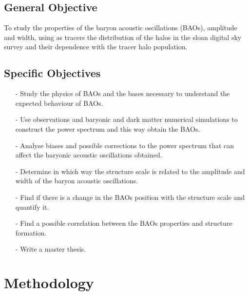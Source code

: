 \documentclass[a4,useAMS,usenatbib,usegraphicx,12pt]{article}
\begin{document}
\subsection*{General Objective}


To study the properties of the baryon acoustic oscillations (BAOs), amplitude and width, using as
tracers the distribution of the halos in the sloan digital sky survey and their dependence with the tracer
halo population.

\subsection*{Specific Objectives}

\begin{itemize} 

\item[-] Study the physics of BAOs and the bases necessary to understand
the expected behaviour of BAOs. 

\item[-] Use observations and baryonic  and  dark matter numerical simulations to construct the power 
spectrum and this way obtain the BAOs.  

\item[-] Analyse biases and possible corrections to the power spectrum that can affect the baryonic
acoustic oscillations obtained.

\item[-] Determine in which way the structure scale is related to the amplitude and width of the baryon
acoustic oscillations. 

\item[-] Find if there is a change in the BAOs position with the structure scale and quantify it. 

\item[-] Find a possible correlation between the BAOs properties and structure formation. 

\item[-] Write a master thesis.

\end{itemize}


\section{Methodology}
\end{document}

